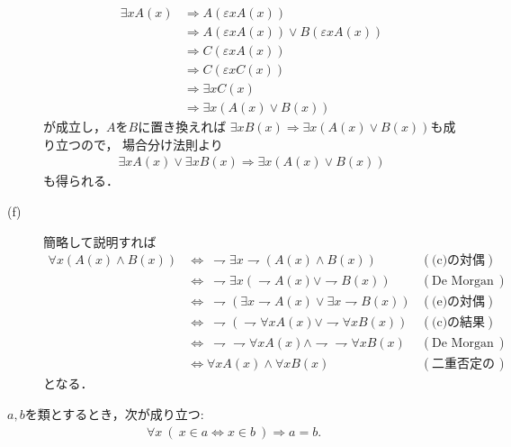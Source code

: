 \begin{prf}
\begin{description}
				\begin{align}
					\exists x A(x) &\Longrightarrow A(\varepsilon x A(x)) \\
						&\Longrightarrow A(\varepsilon x A(x)) \vee B(\varepsilon x A(x)) \\
						&\Longrightarrow C(\varepsilon x A(x)) \\
						&\Longrightarrow C(\varepsilon x C(x)) \\
						&\Longrightarrow \exists x C(x) \\
						&\Longrightarrow \exists x (A(x) \vee B(x))
				\end{align}
				が成立し，$A$を$B$に置き換えれば
				$\exists x B(x) \Longrightarrow \exists x (A(x) \vee B(x))$も成り立つので，
				場合分け法則より
				\begin{align}
					\exists x A(x) \vee \exists x B(x) \Longrightarrow \exists x (A(x) \vee B(x))
				\end{align}
				も得られる．
			
			\item[(f)]
				簡略して説明すれば
				\begin{align}
					\forall x \left( A(x) \wedge B(x) \right)
					&\Longleftrightarrow\ \rightharpoondown \exists x \rightharpoondown \left( A(x) \wedge B(x) \right) & (\mbox{(c)の対偶}) \\
					&\Longleftrightarrow\ \rightharpoondown \exists x \left( \rightharpoondown A(x) \vee \rightharpoondown B(x) \right) & (\mbox{De Morganの法則}) \\
					&\Longleftrightarrow\ \rightharpoondown \left( \exists x \rightharpoondown A(x) \vee \exists x \rightharpoondown B(x) \right) & (\mbox{(e)の対偶}) \\
					&\Longleftrightarrow\ \rightharpoondown \left( \rightharpoondown \forall x A(x) \vee \rightharpoondown \forall x B(x) \right) & (\mbox{(c)の結果}) \\
					&\Longleftrightarrow\ \rightharpoondown \rightharpoondown \forall x A(x) \wedge \rightharpoondown \rightharpoondown \forall x B(x) & (\mbox{De Morganの法則}) \\
					&\Longleftrightarrow \forall x A(x) \wedge \forall x B(x) &(\mbox{二重否定の法則})
				\end{align}
				となる．
				\QED
		\end{description}
	\end{prf}
	
	\begin{screen}
		\begin{axm}[外延性の公理]
			$a,b$を類とするとき，次が成り立つ:
			\begin{align}
				\forall x\ (\ x \in a  \Longleftrightarrow x \in b\ )
				\Longrightarrow a=b.
			\end{align}
		\end{axm}
	\end{screen}
	
